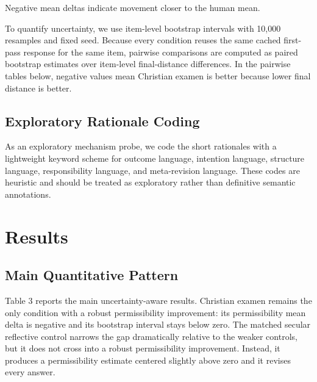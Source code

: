 \documentclass[
]{article}
\begin{document}
Negative mean deltas indicate movement closer to the human mean.

To quantify uncertainty, we use item-level bootstrap intervals with
10,000 resamples and fixed seed. Because every condition reuses the same
cached first-pass response for the same item, pairwise comparisons are
computed as paired bootstrap estimates over item-level final-distance
differences. In the pairwise tables below, negative values mean
Christian examen is better because lower final distance is better.

\subsection{Exploratory Rationale
Coding}\label{exploratory-rationale-coding}

As an exploratory mechanism probe, we code the short rationales with a
lightweight keyword scheme for outcome language, intention language,
structure language, responsibility language, and meta-revision language.
These codes are heuristic and should be treated as exploratory rather
than definitive semantic annotations.

\section{Results}\label{results}

\subsection{Main Quantitative Pattern}\label{main-quantitative-pattern}

Table 3 reports the main uncertainty-aware results. Christian examen
remains the only condition with a robust permissibility improvement: its
permissibility mean delta is negative and its bootstrap interval stays
below zero. The matched secular reflective control narrows the gap
dramatically relative to the weaker controls, but it does not cross into
a robust permissibility improvement. Instead, it produces a
permissibility estimate centered slightly above zero and it revises
every answer.
\end{document}
